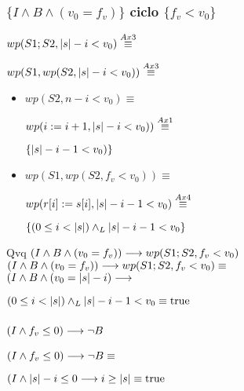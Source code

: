 \documentclass{article}
\begin{document}
\subsubsection*{$\{I \wedge B \wedge (v_{0} = f_{v})\}$ ciclo $\{f_{v} < v_{0}\}$}

$wp(S1;S2, |s|-i<v_{0}) \stackrel{Ax3}{\equiv}$

$wp(S1, wp(S2, |s|-i<v_{0})) \stackrel{Ax3}{\equiv}$

\begin{itemize}
    \item $wp(S2, n-i<v_{0}) \equiv$
    
    $ wp(i:= i+1, |s|-i<v_{0})) \stackrel{Ax1}{\equiv}$

    $\{|s|-i-1<v_{0}) \}$

    \item $wp(S1, wp(S2, f_{v} < v_{0})) \equiv$

    $wp(r[i]:= s[i], |s|-i-1<v_{0}) \stackrel{Ax4}{\equiv}$

    $\{ (0 \leq i < |s|) \land _L |s|-i-1<v_{0} \} $

\end{itemize}

Qvq $(I \wedge B \wedge (v_{0} = f_{v})) \longrightarrow wp(S1;S2, f_{v} < v_{0})$ \\

$(I \wedge B \wedge (v_{0} = f_{v})) \longrightarrow wp(S1;S2, f_{v} < v_{0}) \equiv$ \\

$(I \wedge B \wedge (v_{0} = |s|-i)\longrightarrow$

$(0 \leq i < |s|) \land _L |s|-i-1<v_{0} \equiv \mathrm{true}$

\subsubsection*{$(I \wedge f_{v} \leq 0) \longrightarrow \neg B$}

$(I \wedge f_{v} \leq 0) \longrightarrow \neg B \equiv $

$(I \wedge |s|-i \leq 0 \longrightarrow i \geq |s| \equiv \mathrm{true}$
\end{document}
